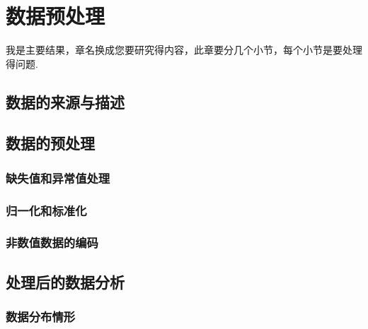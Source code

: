 \chapter{数据预处理}  %

我是主要结果，章名换成您要研究得内容，此章要分几个小节，每个小节是要处理得问题.


\section{数据的来源与描述}



\section{数据的预处理}


\subsection{缺失值和异常值处理}



\subsection{归一化和标准化}



\subsection{非数值数据的编码}

\section{处理后的数据分析}


\subsection{数据分布情形}



 